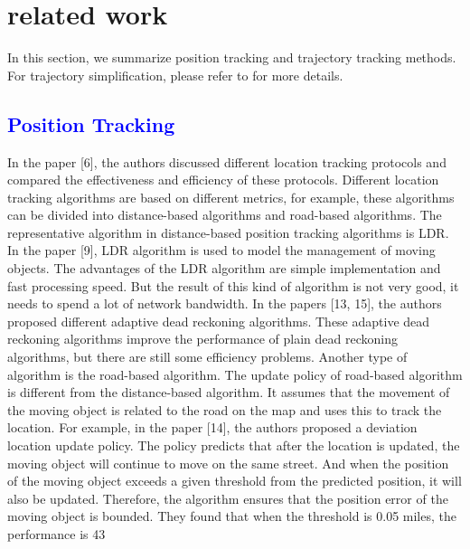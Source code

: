 
\section{related work}
\label{sec-related}

In this section, we summarize position tracking and trajectory tracking methods. For trajectory simplification, please refer to \cite{Zhang:Evaluation, Lin:Cised} for more details.

\subsection{\textcolor{blue}{Position Tracking}}
In the paper [6], the authors discussed different location tracking protocols and compared the effectiveness and efficiency of these protocols. Different location tracking algorithms are based on different metrics, for example, these algorithms can be divided into distance-based algorithms and road-based algorithms.
The representative algorithm in distance-based position tracking algorithms is LDR. In the paper [9], LDR algorithm is used to model the management of moving objects. The advantages of the LDR algorithm are simple implementation and fast processing speed. But the result of this kind of algorithm is not very good, it needs to spend a lot of network bandwidth. 
In the papers [13, 15], the authors proposed different adaptive dead reckoning algorithms. These adaptive dead reckoning algorithms improve the performance of plain dead reckoning algorithms, but there are still some efficiency problems.
Another type of algorithm is the road-based algorithm. The update policy of road-based algorithm is different from the distance-based algorithm. It assumes that the movement of the moving object is related to the road on the map and uses this to track the location. For example, in the paper [14], the authors proposed a deviation location update policy. The policy predicts that after the location is updated, the moving object will continue to move on the same street. And when the position of the moving object exceeds a given threshold from the predicted position, it will also be updated. Therefore, the algorithm ensures that the position error of the moving object is bounded. They found that when the threshold is 0.05 miles, the performance is 43%
